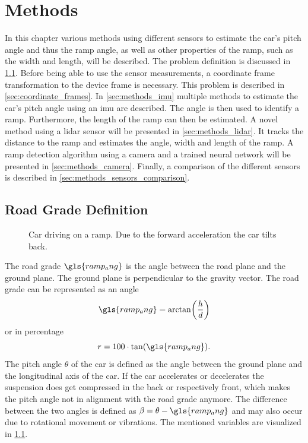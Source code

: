 \chapter{Methods}
\label{ch:Methods}

In this chapter various methods using different sensors to estimate the car's pitch angle and thus the ramp angle, as well as other properties of the ramp, such as the width and length, will be described.
The problem definition is discussed in \cref{sec:road_grade_definition}.
Before being able to use the sensor measurements, a coordinate frame transformation to the device frame is necessary.
This problem is described in \cref{sec:coordinate_frames}.
In \cref{sec:methods_imu} multiple methods to estimate the car's pitch angle using an \gls{imu} are described.
The angle is then used to identify a ramp.
Furthermore, the length of the ramp can then be estimated.
A novel method using a \gls{lidar} sensor will be presented in \cref{sec:methods_lidar}.
It tracks the distance to the ramp and estimates the angle, width and length of the ramp.
A ramp detection algorithm using a camera and a trained neural network will be presented in \cref{sec:methods_camera}.
Finally, a comparison of the different sensors is described in \cref{sec:methods_sensors_comparison}.


\section{Road Grade Definition}
\label{sec:road_grade_definition}
\begin{figure}[b]
    \centering
    
    \caption[Ramp angle definition]{Car driving on a ramp. Due to the forward acceleration the car tilts back.}
    \label{fig:tikz_car_tilt}
\end{figure}
The road grade $\gls{ramp_ang}$ is the angle between the road plane and the ground plane.
The ground plane is perpendicular to the gravity vector.
The road grade can be represented as an angle
\begin{equation}
    \gls{ramp_ang} = \arctan(\frac{h}{d})
\end{equation}
or in percentage
\begin{equation}
    r = 100\cdot\tan(\gls{ramp_ang}).
\end{equation}
The pitch angle $\theta$ of the car is defined as the angle between the ground plane and the longitudinal axis of the car.
If the car accelerates or decelerates the suspension does get compressed in the back or respectively front, which makes the pitch angle not in alignment with the road grade anymore.
The difference between the two angles is defined as $\beta = \theta- \gls{ramp_ang}$ and may also occur due to rotational movement or vibrations.
The mentioned variables are visualized in \cref{fig:tikz_car_tilt}.



